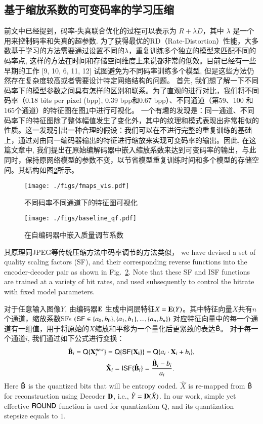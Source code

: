 \documentclass[macfonts,phd,oneside,nobackinfo]{njuthesis}
\begin{document}
\subsection{基于缩放系数的可变码率的学习压缩}
前文中已经提到，码率-失真联合优化的过程可以表示为 $R + \lambda D$，其中 $\lambda$ 是一个用来控制码率和失真的超参数. 为了获得最优的RD（Rate-Distortion）性能，大多数基于学习的方法需要通过设置不同的$\lambda$，重复训练多个独立的模型来匹配不同的码率点, 这样的方法在时间和存储空间维度上来说都非常的低效。目前已经有一些早期的工作 [9, 10, 6, 11, 12] 试图避免为不同码率训练多个模型, 但是这些方法仍然存在复杂度较高或者需要设计特定网络结构的问题。
首先, 我们想了解一下不同码率下的模型参数之间具有怎样的区别和联系。为了直观的进行对比，我们将不同码率（0.18 bits per pixel (bpp), 0.39 bpp和0.67 bpp）、不同通道（第59、100 和165个通道）的特征图在图\ref{fig:visualize}中进行可视化。 一个有趣的发现是：同一通道、不同码率下的特征图除了整体幅值发生了变化外，其中的纹理和模式表现出非常相似的性质。这一发现引出一种合理的假设：我们可以在不进行完整的重复训练的基础上，通过对由同一编码器输出的特征进行缩放来实现可变码率的输出。因此, 在这篇文章中, 我们提出在原始编解码器中嵌入缩放系数来达到可变码率的输出，与此同时，保持原网络模型的参数不变，以节省模型重复训练时间和多个模型的存储空间。其结构如图\ref{fig:qf}所示。

\begin{figure}[t]
   \centering
   \texttt{[image: ./figs/fmaps\_vis.pdf]}  
   \caption{不同码率不同通道下的特征图可视化}
   \label{fig:visualize}
\end{figure}

\begin{figure}[htbp]
\centering
\texttt{[image: ./figs/baseline\_qf.pdf]}
\caption{在自编码器中嵌入质量调节系数}
\label{fig:qf}
\end{figure}

其原理同JPEG等传统压缩方法中码率调节的方法类似， we have devised a set of quality scaling factors (SF), and their corresponding reverse functions into the encoder-decoder pair as shown in Fig.~\ref{fig:qf}. Note that these SF and ISF functions are trained at a variety of bit rates, and used subsequently to control the bitrate with fixed model parameters.

对于任意输入图像$Y$, 由编码器$\bf E$ 生成中间层特征$X = {\bf E}(Y)$。其中特征向量$X$共有$n$个通道，缩放系数SFs $({\sf SF} \in \{a_0,b_0\},\{a_1,b_1\},...,\{a_n,b_n\})$ 对应特征向量中的每一个通道有一组值，用于将原始的$X$缩放和平移为一个量化后更紧致的表达$\hat{\sf B}$。
对于每一个通道$i$, 我们通过如下公式进行变换：
\begin{align}
  \hat{\bf B}_i  = {\sf Q}\{ {\bf X}^{new}_i\} & = {\sf Q}\{ {\sf SF}\{{\bf X_i}\}\} = {\sf Q}\{ a_i\cdot{\bf X}_i + b_i\}, \label{eq:sf}\\
  & \hat{\bf X}_i = {\sf ISF}\{\hat{\bf B}_i\} = \frac{\hat{\bf B}_i - b_i}{a_i}.
\end{align}
Here $\hat{\sf B}$ is the quantized bits that will be entropy coded. $\hat X$ is re-mapped from $\hat {\sf B}$ for reconstruction using Decoder $\bf D$, i.e., $\hat{Y}={\bf D}({\hat X})$. 
In our work, simple yet effective $\sf ROUND$ function is used for quantization {\sf Q}, and its quantization stepsize equals to $1$.
\end{document}
